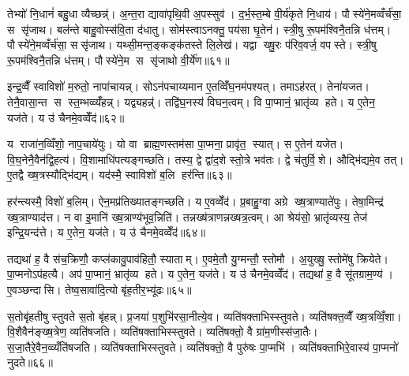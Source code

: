 तेभ्यो॑ नि॒धानं॑ बहु॒धा व्यैच्छन्न्॑। अ॒न्त॒रा द्यावा॑पृथि॒वी अ॒पस्सुव॑। द॒र्भ॒स्त॒म्बे वी॒र्य॑कृते नि॒धाय॑। पौस्ये॑ने॒मव्वँर्च॑सा॒ स सृ॑जाथ। बल॑न्ते बाहु॒वोस्स॑वि॒ता द॑धातु। सोम॑स्त्वाऽनक्तु॒ पय॑सा घृ॒तेन॑। स्त्री॒षु रू॒पम॑श्विनै॒तन्नि ध॑त्तम्। पौस्ये॑ने॒मव्वँर्च॑सा॒ ससृ॑जाथ। यथ्सी॒मन्त॒ङ्कङ्क॑तस्ते लि॒लेख॑। यद्वा ख्षु॒रः प॑रिव॒वर्ज॒ वपस्ते। स्त्री॒षु रू॒पम॑श्विनै॒तन्नि ध॑त्तम्। पौस्ये॑ने॒म स सृ॑जाथो वी॒र्ये॑ण॥६१॥\anuvakamend[अवास्राग्दी॒ख्षा व॒शिनी॒ ह्यु॑ग्राऽद॑धाद्व॒वर्ज॒ वप स्ते॒ द्वे च॑]

इन्द्र॒व्वैँ स्वाविशो॑ म॒रुतो॒ नापा॑चायन्न्। सोऽन॑पचाय्यमान ए॒तव्विँ॑घ॒नम॑पश्यत्। तमाऽह॑रत्। तेना॑यजत। तेनै॒वासा॒न्त स स्त॒म्भव्व्यँ॑हन्न्। यद्व्यहन्न्॑। तद्वि॑घ॒नस्य॑ विघन॒त्वम्। वि पा॒प्मानं॒ भ्रातृ॑व्य हते। य ए॒तेन॒ यज॑ते। य उ॑ चैनमे॒वव्वेँद॑॥६२॥

य राजा॑न॒व्विँशो॒ नाप॒चाये॑युः। यो वा ब्राह्म॒णस्तम॑सा पा॒प्मना॒ प्रावृ॑त॒ स्यात्। स ए॒तेन॑ यजेत। वि॒घ॒नेनै॒वैन॑द्वि॒हत्य॑। वि॒शामाधि॑पत्यङ्गच्छति। तस्य॒ द्वे द्वा॑द॒शे स्तो॒त्रे भव॑तः। द्वे च॑तुर्वि॒शे। औद्भि॑द्यमे॒व तत्। ए॒तद्वै ख्ष॒त्रस्यौद्भि॑द्यम्। यद॑स्मै॒ स्वाविशो॑ ब॒लि हर॑न्ति॥६३॥

हर॑न्त्यस्मै॒ विशो॑ ब॒लिम्। ऐन॒मप्र॑तिख्यातङ्गच्छति। य ए॒वव्वेँद॑। प्र॒बाहु॒ग्वा अग्रे ख्ष॒त्राण्याते॑पुः। तेषा॒मिन्द्र॑ ख्ष॒त्राण्याद॑त्त। न वा इ॒मानि॑ ख्ष॒त्राण्य॑भूव॒न्निति॑। तन्नख्ष॑त्राणन्नख्षत्र॒त्वम्। आ श्रेय॑सो॒ भ्रातृ॑व्यस्य॒ तेज॑ इन्द्रि॒यन्द॑त्ते। य ए॒तेन॒ यज॑ते। य उ॑ चैनमे॒वव्वेँद॑॥६४॥

तद्यथा॑ ह॒ वै स॑च॒क्रिणौ॒ कप्ल॑कावु॒पाव॑हितौ॒ स्याताम्। ए॒वमे॒तौ यु॒ग्मन्तौ॒ स्तोमौ। अ॒युख्षु॒ स्तोमे॑षु क्रियेते। पा॒प्मनोऽप॑हत्यै। अप॑ पा॒प्मानं॒ भ्रातृ॑व्य हते। य ए॒तेन॒ यज॑ते। य उ॑ चैनमे॒वव्वेँद॑। तद्यथा॑ ह॒ वै सू॑तग्राम॒ण्य॑। ए॒वञ्छन्दासि। तेष्व॒सावा॑दि॒त्यो बृ॑ह॒तीर॒भ्यू॑ढः॥६५॥

स॒तोबृ॑हतीषु स्तुवते स॒तो बृ॑हन्न्। प्र॒जया॑ प॒शुभि॑रसा॒नीत्ये॒व। व्यति॑षक्ताभिस्स्तुवते। व्यति॑षक्त॒व्वैँ ख्ष॒त्रव्विँ॒शा। वि॒शैवैन॑ङ्ख्ष॒त्रेण॒ व्यति॑षजति। व्यति॑षक्ताभिस्स्तुवते। व्यति॑षक्तो॒ वै ग्रा॑म॒णीस्स॑जा॒तैः। स॒जा॒तैरे॒वैन॒व्व्यँति॑षजति। व्यति॑षक्ताभिस्स्तुवते। व्यति॑षक्तो॒ वै पुरु॑षः पा॒प्मभि॑। व्यति॑षक्ताभिरे॒वास्य॑ पा॒प्मनो॑ नुदते॥६६॥


